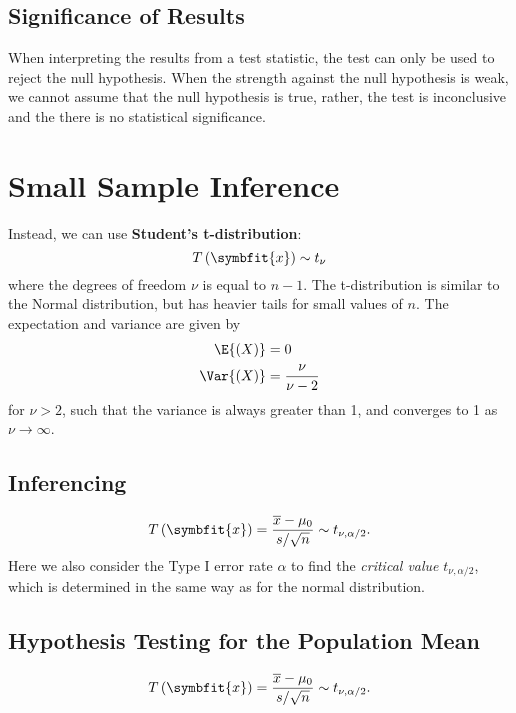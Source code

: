 \documentclass{article}
\begin{document}
\begin{multicols}{3}
\subsection{Significance of Results}
When interpreting the results from a test statistic, the test can only be used to reject the null hypothesis.
When the strength against the null hypothesis is weak, we cannot assume that the null hypothesis is true,
rather, the test is inconclusive and the there is no statistical significance.
\section{Small Sample Inference}
Instead, we can use \textbf{Student's t-distribution}:
\begin{equation*}
    T\left( \symbfit{x} \right) \sim t_{\nu}
\end{equation*}
where the degrees of freedom \(\nu\) is equal to \(n - 1\). The t-distribution is similar to the Normal distribution,
but has heavier tails for small values of \(n\). The expectation and variance are given by
\begin{align*}
    \E{\left( X \right)}   & = 0                   \\
    \Var{\left( X \right)} & = \frac{\nu}{\nu - 2} \\
\end{align*}
for \(\nu > 2\), such that the variance is always greater than 1, and
converges to 1 as \(\nu \rightarrow \infty\).
\subsection{Inferencing}
\begin{equation*}
    T\left( \symbfit{x} \right) = \frac{\overline{x} - \mu_0}{s / \sqrt{n}} \sim t_{\nu, \alpha/2}.
\end{equation*}
Here we also consider the Type I error rate \(\alpha\) to find the \textit{critical value} \(t_{\nu,\alpha/2}\), which is determined
in the same way as for the normal distribution.
\subsection{Hypothesis Testing for the Population Mean}
\begin{equation*}
    T\left( \symbfit{x} \right) = \frac{\overline{x} - \mu_0}{s/\sqrt{n}} \sim t_{\nu, \alpha/2}.
\end{equation*}

\end{multicols}
\end{document}
